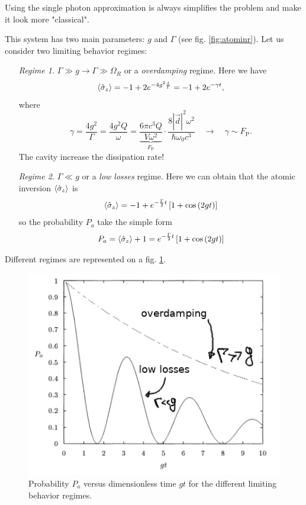 Using the single photon approximation is always simplifies the problem and make it look more "classical".

This system has two main parameters: $g$ and $\Gamma$ (see fig. \ref{fig:atominr}). Let us consider two limiting behavior regimes:
\begin{enumerate}
	\item[\textit{Regime 1.}] $\Gamma \gg g \to \Gamma \gg \Omega_R$ or a  \textit{overdamping} regime. Here we have
	\begin{equation}
		\left\langle {\hat{\sigma}_z} \right\rangle = -1 + 2 e^{-4 g^2 \frac{t}{\Gamma}} = - 1 + 2e^{- \gamma t},
	\end{equation}
	where 
	\begin{equation}
		\gamma = \frac{4 g^2}{\Gamma} = \frac{4 g^2 Q}{\omega} = \underbrace{\frac{6\pi c^3 Q}{V \omega^2}}_{F_{\text{P}}} \cdot \frac{8 \left|\vec{d}\right|^2 \omega^2}{\hbar \omega_0 c^3} \quad \to \quad \gamma \sim F_{\text{P}}.
	\end{equation}
	The cavity increase the dissipation rate!
	\item[\textit{Regime 2.}] $\Gamma \ll g$ or a \textit{low losses} regime. Here we can obtain that the atomic inversion $\left\langle {\hat{\sigma}_z} \right\rangle$ is
	\begin{equation}
		\left\langle {\hat{\sigma}_z} \right\rangle = - 1 + e^{- \frac{\Gamma}{2} t} \left[1 + \cos \left( 2 gt \right)\right]
	\end{equation}
	so the probability $P_a$ take the simple form
	\begin{equation}
		P_a = \left\langle {\hat{\sigma}_z} \right\rangle + 1 = e^{- \frac{\Gamma}{2} t} \left[1 + \cos \left( 2 gt \right)\right]
	\end{equation}
\end{enumerate}
Different regimes are represented on a fig. \ref{fig:regimes}.

\begin{figure}
	\centering
	\includegraphics[width=0.7\linewidth]{fig/L10/regimes}
	\caption{Probability $P_a$ versus dimensionless time $gt$ for the different limiting behavior regimes.}
	\label{fig:regimes}
\end{figure}
